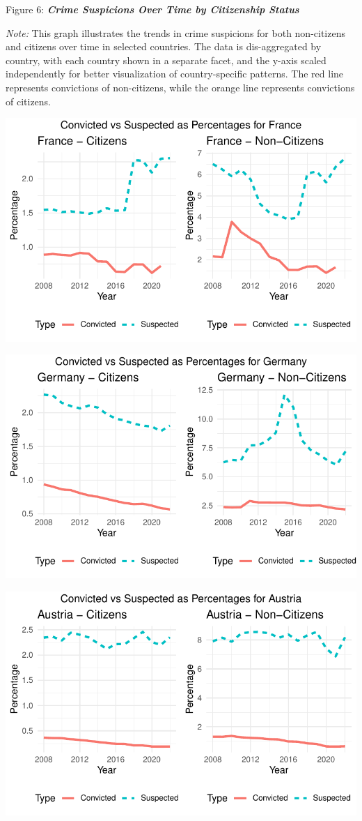 \documentclass[
]{article}
\begin{document}
Figure 6: \textbf{\emph{Crime Suspicions Over Time by Citizenship
Status}}

\emph{Note:} This graph illustrates the trends in crime suspicions for
both non-citizens and citizens over time in selected countries. The data
is dis-aggregated by country, with each country shown in a separate
facet, and the y-axis scaled independently for better visualization of
country-specific patterns. The red line represents convictions of
non-citizens, while the orange line represents convictions of citizens.

\includegraphics{DataMan_Project_files/figure-pdf/unnamed-chunk-31-1.pdf}

\includegraphics{DataMan_Project_files/figure-pdf/unnamed-chunk-31-2.pdf}

\includegraphics{DataMan_Project_files/figure-pdf/unnamed-chunk-31-3.pdf}
\end{document}
